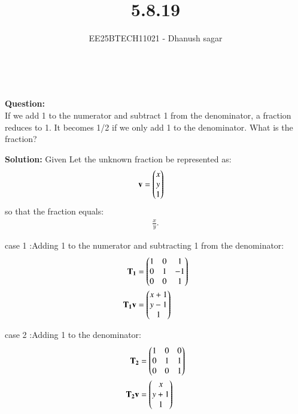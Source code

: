 \documentclass[journal]{IEEEtran}
\begin{document}


\title{5.8.19}
\author{EE25BTECH11021 - Dhanush sagar}
\maketitle \vspace{-1cm}
\renewcommand{\thefigure}{\theenumi}
\renewcommand{\thetable}{\theenumi}
\setlength{\intextsep}{10pt} %

\
\renewcommand{\thetable}{\theenumi}

\textbf{Question:}  \\
If we add 1 to the numerator and subtract 1 from the denominator, a fraction reduces
to 1. It becomes 1/2 if we only add 1 to the denominator. What is the fraction?


\textbf{Solution:}
Given
Let the unknown fraction be represented as:
\begin{align}
\mathbf{v} &= \begin{pmatrix}x \\ y \\ 1\end{pmatrix}
\end{align}
so that the fraction equals:
\begin{align}
\frac{x}{y}.
\end{align}

case 1 :Adding 1 to the numerator and subtracting 1 from the denominator:
\begin{align}
\mathbf{T_1} &= \begin{pmatrix}1 & 0 & 1 \\ 0 & 1 & -1 \\ 0 & 0 & 1\end{pmatrix} \\
\mathbf{T_1} \mathbf{v} &= \begin{pmatrix}x+1 \\ y-1 \\ 1\end{pmatrix}
\end{align}



case 2 :Adding 1 to the denominator:
\begin{align}
\mathbf{\mathbf{T_2}} &= \begin{pmatrix}1 & 0 & 0 \\ 0 & 1 & 1 \\ 0 & 0 & 1\end{pmatrix} \\
\mathbf{\mathbf{T_2}} \mathbf{v} &= \begin{pmatrix}x \\ y+1 \\ 1\end{pmatrix}
\end{align}
\end{document}
